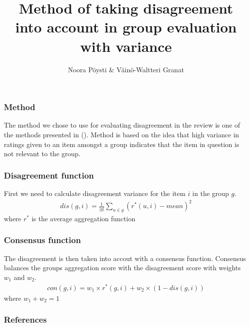 \documentclass{beamer}
\title{Method of taking disagreement into account in group evaluation with variance}
\author{Noora Pöysti \& Väinö-Waltteri Granat}
\begin{document}
\frame{\titlepage}

\begin{frame}
    \frametitle{Method}
    The method we chose to use for evaluating disagreement in the review is one of the methods presented in (\cite{Amer-YahiaSihem2009Grsa}).
    Method is based on the idea that high variance in ratings given to an item amongst a group indicates that the item in question is not 
    relevant to the group. 
   \end{frame}

\begin{frame}
    \frametitle{Disagreement function}
    First we need to calculate disagreement variance for the item $i$ in the group $g$.
    \begin{align*}
        dis(g,i) = \frac{1}{|g|}\sum \limits _{u\in g} (r^{*}(u, i) - mean)^2
    \end{align*}
    where $r^*$ is the average aggregation function
\end{frame}

\begin{frame}
    \frametitle{Consensus function}
    The disagreement is then taken into accout with
    a consensus function. Consensus balances the groups aggregation score with the disagreement score with weights $w_1$ and $w_2$.
    \begin{align*}
        con(g,i) = w_1 \times r^{*}(g,i) + w_2 \times (1-dis(g,i))
    \end{align*}
 where $w_1 + w_2 = 1$
\end{frame}

\begin{frame}
   \frametitle{References} 
   \printbibliography
\end{frame}
\end{document}
